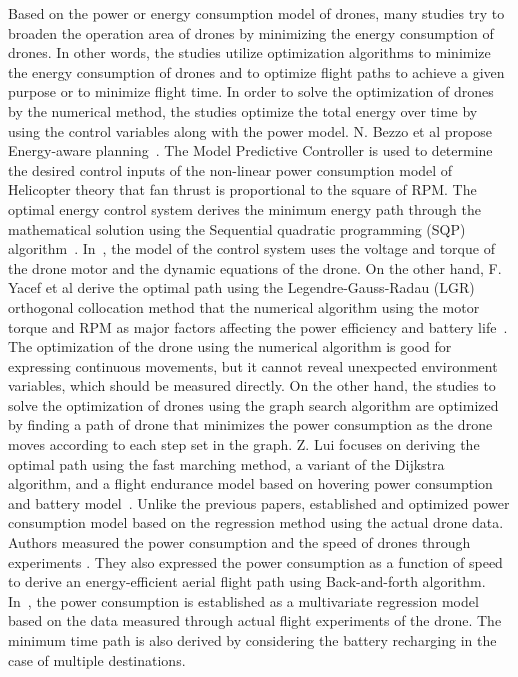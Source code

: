 \documentclass[journal]{./template/IEEEtran}
\begin{document}
Based on the power or energy consumption model of drones, many studies try to broaden the operation area of drones by minimizing the energy consumption of drones.
In other words, the studies utilize optimization algorithms to minimize the energy consumption of drones and to optimize flight paths to achieve a given purpose or to minimize flight time.
In order to solve the optimization of drones by the numerical method, the studies optimize the total energy over time by using the control variables along with the power model. 
N. Bezzo et al propose Energy-aware planning~\cite{ref_5}. The Model Predictive Controller is used to determine the desired control inputs of the non-linear power consumption model of Helicopter theory that fan thrust is proportional to the square of RPM.
The optimal energy control system derives the minimum energy path through the mathematical solution using the Sequential quadratic programming (SQP) algorithm~\cite{ref_6}. 
In~\cite{ref_6}, the model of the control system uses the voltage and torque of the drone motor and the dynamic equations of the drone. 
On the other hand, F. Yacef et al derive the optimal path using the Legendre-Gauss-Radau (LGR) orthogonal collocation method that the numerical algorithm using the motor torque and RPM as major factors affecting the power efficiency and battery life~\cite{ref_7}. 
The optimization of the drone using the numerical algorithm is good for expressing continuous movements, but it cannot reveal unexpected environment variables, which should be measured directly.
On the other hand, the studies to solve the optimization of drones using the graph search algorithm are optimized by finding a path of drone that minimizes the power consumption as the drone moves according to each step set in the graph. 
Z. Lui focuses on deriving the optimal path using the fast marching method, a variant of the Dijkstra algorithm, and a flight endurance model based on hovering power consumption and battery model~\cite{ref_10}.
Unlike the previous papers, \cite{ref_8,ref_9} established and optimized power consumption model based on the regression method using the actual drone data.
Authors measured the power consumption and the speed of drones through experiments \cite{ref_8}. They also expressed the power consumption as a function of speed to derive an energy-efficient aerial flight path using Back-and-forth algorithm.
In~\cite{ref_9}, the power consumption is established as a multivariate regression model based on the data measured through actual flight experiments of the drone.
The minimum time path is also derived by considering the battery recharging in the case of multiple destinations.
\end{document}
